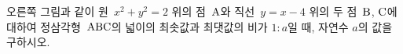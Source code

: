 \noindent\begin{minipage}[t]{0.58\linewidth}\vspace{0pt}\raggedright 오른쪽 그림과 같이 원~$x^2+y^2=2$ 위의 점~$\mathrm{A}$와 직선~$y=x-4$ 위의 두 점~$\mathrm{B}$, $\mathrm{C}$에 대하여 정삼각형~$\mathrm{ABC}$의 넓이의 최솟값과 최댓값의 비가 $1:a$일 때, 자연수 $a$의 값을 구하시오.\end{minipage}\hfill\begin{minipage}[t]{0.4\linewidth}\vspace{0pt}\centering \resizebox{\ifdim\width>\linewidth\linewidth\else\width\fi}{!}{}\end{minipage}\par

